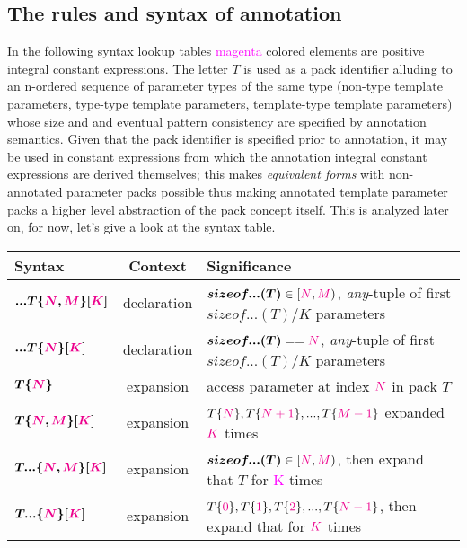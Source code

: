
\subsection{The rules and syntax of annotation}

\p In the following syntax lookup tables \textcolor{Magenta}{magenta} colored elements are positive integral constant expressions.
The letter $T$ is used as a pack identifier alluding to an n-ordered sequence of parameter types of the same type (non-type template parameters, type-type template parameters, template-type template parameters) whose size and and eventual pattern consistency are specified by annotation semantics.
Given that the pack identifier is specified prior to annotation, it may be used in constant expressions from which the annotation integral constant expressions are derived themselves; this makes \textit{equivalent forms} with non-annotated parameter packs possible thus making annotated template parameter packs a higher level abstraction of the pack concept itself.
This is analyzed later on, for now, let's give a look at the syntax table.

\begin{tabularx}{\textwidth}{l|c|X}
  \textbf{Syntax} & \textbf{Context}  &\textbf{Significance} \\
\hline
$\bm{...T\{\textcolor{Magenta}{\textcolor{Magenta}{N}},\textcolor{Magenta}{M}\}[\textcolor{Magenta}{K}]}$ & declaration & $\bm{sizeof...(T)} \in [\textcolor{Magenta}{N},\textcolor{Magenta}{M})$, \textit{any}-tuple of first $sizeof...(T)/K$ parameters \\
$\bm{...T\{\textcolor{Magenta}{N}\}[\textcolor{Magenta}{K}]}$ & declaration & $\bm{sizeof...(T)} == \textcolor{Magenta}{N}$, \textit{any}-tuple of first $sizeof...(T)/K$ parameters \\
$\bm{T\{\textcolor{Magenta}{N}\}}$ & expansion & access parameter at index $\textcolor{Magenta}{N}$ in pack $T$ \\
$\bm{T\{\textcolor{Magenta}{N},\textcolor{Magenta}{M}\}[\textcolor{Magenta}{K}]}$ & expansion & $T\{\textcolor{Magenta}{N}\},T\{\textcolor{Magenta}{N+1}\},...,T\{\textcolor{Magenta}{M-1}\}$ expanded $\textcolor{Magenta}{K}$ times \\
$\bm{T...\{\textcolor{Magenta}{N},\textcolor{Magenta}{M}\}[\textcolor{Magenta}{K}]}$ & expansion & $\bm{sizeof...(T)} \in [\textcolor{Magenta}{N},\textcolor{Magenta}{M})$, then expand that $T$ for \textcolor{Magenta}{K} times   \\
$\bm{T...\{\textcolor{Magenta}{N}\}[\textcolor{Magenta}{K}]}$ & expansion & $T\{\textcolor{Magenta}{0}\},T\{\textcolor{Magenta}{1}\},T\{\textcolor{Magenta}{2}\},...,T\{\textcolor{Magenta}{N-1}\}$, then expand that for $\textcolor{Magenta}{K}$ times\\
\end{tabularx}

